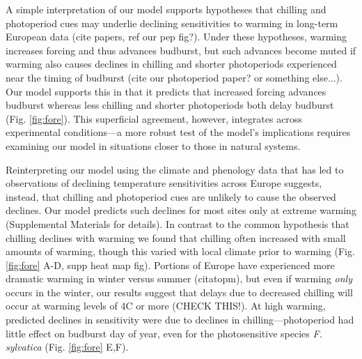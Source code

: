 \documentclass{article}
\begin{document}
\par A simple interpretation of our model supports hypotheses that chilling and photoperiod cues may underlie declining sensitivities to warming in long-term European data (cite papers, ref our pep fig?). Under these hypotheses, warming increases forcing and thus advances budburst, but such advances become muted if warming also causes declines in chilling and shorter photoperiods experienced near the timing of budburst (cite our photoperiod paper? or something else...). Our model supports this in that it predicts that increased forcing advances budburst whereas less chilling and shorter photoperiods both delay budburst (Fig. \ref{fig:fore}). This superficial agreement, however, integrates across experimental conditions---a more robust test of the model's implications requires examining our model in situations closer to those in natural systems.

\par Reinterpreting our model using the climate and phenology data that has led to observations of declining temperature sensitivities across Europe suggests, instead, that chilling and photoperiod cues are unlikely to cause the observed declines. Our model predicts such declines for most sites only at extreme warming (Supplemental Materials for details). In contrast to the common hypothesis that chilling declines with warming we found that chilling often increased with small amounts of warming, though this varied with local climate prior to warming (Fig. \ref{fig:fore} A-D, supp heat map fig). Portions of Europe have experienced more dramatic warming in winter versus summer (citatopm), but even if warming \emph{only} occurs in the winter, our results suggest that delays due to decreased chilling will occur at warming levels of 4\degree C or more (CHECK THIS!). At high warming, predicted declines in sensitivity were due to declines in chilling---photoperiod had little effect on budburst day of year, even for the photosensitive species \emph{F. sylvatica} (Fig. \ref{fig:fore} E,F).  %
\end{document}

